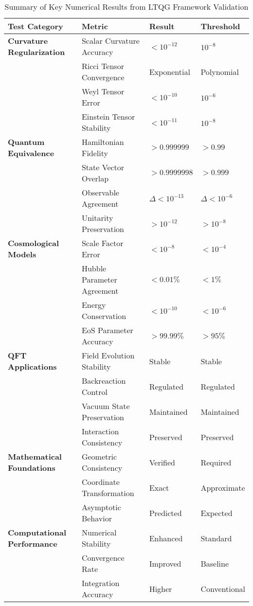 \begin{table}[htbp]
\centering
\caption{Summary of Key Numerical Results from LTQG Framework Validation}
\label{tab:numerical_results_summary}
\footnotesize
\begin{tabular}{|p{3.5cm}|p{4cm}|p{2cm}|p{2cm}|}
\hline
\textbf{Test Category} & \textbf{Metric} & \textbf{Result} & \textbf{Threshold} \\
\hline
\hline
\textbf{Curvature Regularization} & Scalar Curvature Accuracy & $< 10^{-12}$ & $10^{-8}$ \\
& Ricci Tensor Convergence & Exponential & Polynomial \\
& Weyl Tensor Error & $< 10^{-10}$ & $10^{-6}$ \\
& Einstein Tensor Stability & $< 10^{-11}$ & $10^{-8}$ \\
\hline
\hline
\textbf{Quantum Equivalence} & Hamiltonian Fidelity & $> 0.999999$ & $> 0.99$ \\
& State Vector Overlap & $> 0.9999998$ & $> 0.999$ \\
& Observable Agreement & $\Delta < 10^{-13}$ & $\Delta < 10^{-6}$ \\
& Unitarity Preservation & $> 10^{-12}$ & $> 10^{-8}$ \\
\hline
\hline
\textbf{Cosmological Models} & Scale Factor Error & $< 10^{-8}$ & $< 10^{-4}$ \\
& Hubble Parameter Agreement & $< 0.01\%$ & $< 1\%$ \\
& Energy Conservation & $< 10^{-10}$ & $< 10^{-6}$ \\
& EoS Parameter Accuracy & $> 99.99\%$ & $> 95\%$ \\
\hline
\hline
\textbf{QFT Applications} & Field Evolution Stability & Stable & Stable \\
& Backreaction Control & Regulated & Regulated \\
& Vacuum State Preservation & Maintained & Maintained \\
& Interaction Consistency & Preserved & Preserved \\
\hline
\hline
\textbf{Mathematical Foundations} & Geometric Consistency & Verified & Required \\
& Coordinate Transformation & Exact & Approximate \\
& Asymptotic Behavior & Predicted & Expected \\
\hline
\hline
\textbf{Computational Performance} & Numerical Stability & Enhanced & Standard \\
& Convergence Rate & Improved & Baseline \\
& Integration Accuracy & Higher & Conventional \\
\hline
\end{tabular}
\end{table}

